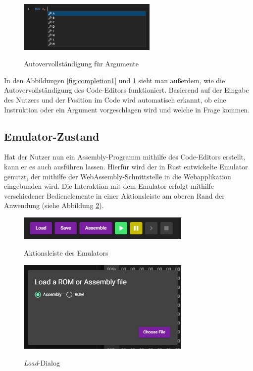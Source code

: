 \begin{figure}
    \caption{Autovervollständigung für Argumente}
    \centering
    \includegraphics[width=0.6\textwidth]{Bilder/Completion2.png}
    \label{fig:completion2}
\end{figure}

In den Abbildungen \ref{fig:completion1} und \ref{fig:completion2} sieht man außerdem, wie die Autovervollständigung des Code-Editors funktioniert. Basierend auf der Eingabe des Nutzers und der Position im Code wird automatisch erkannt, ob eine Instruktion oder ein Argument vorgeschlagen wird und welche in Frage kommen.

\subsection{Emulator-Zustand}

Hat der Nutzer nun ein Assembly-Programm mithilfe des Code-Editors erstellt, kann er es auch ausführen lassen. Hierfür wird der in Rust entwickelte Emulator genutzt, der mithilfe der WebAssembly-Schnittstelle in die Webapplikation eingebunden wird. Die Interaktion mit dem Emulator erfolgt mithilfe verschiedener Bedienelemente in einer Aktionsleiste am oberen Rand der Anwendung (siehe Abbildung \ref{fig:actionbar}).

\begin{figure}[h]
    \caption{Aktionsleiste des Emulators}
    \centering
    \includegraphics[width=0.75\textwidth]{Bilder/Aktionsleiste.png}
    \label{fig:actionbar}
\end{figure}

\begin{figure}
    \caption{\textit{Load}-Dialog}
    \centering
    \includegraphics[width=0.75\textwidth]{Bilder/LoadDialog.png}
    \label{fig:loaddialog}
\end{figure}

